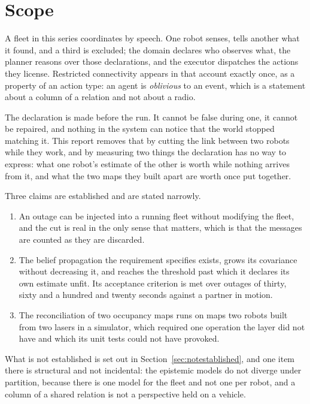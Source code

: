\documentclass[11pt,a4paper]{article}
\theoremstyle{definition}
\begin{document}
\tableofcontents
\newpage

\section{Scope}
\label{sec:scope}

A fleet in this series coordinates by speech. One robot senses, tells another
what it found, and a third is excluded; the domain declares who observes what,
the planner reasons over those declarations, and the executor dispatches the
actions they license. Restricted connectivity appears in that account exactly
once, as a property of an action type: an agent is \emph{oblivious} to an
event, which is a statement about a column of a relation and not about a radio.

The declaration is made before the run. It cannot be false during one, it
cannot be repaired, and nothing in the system can notice that the world stopped
matching it. This report removes that by cutting the link between two robots
while they work, and by measuring two things the declaration has no way to
express: what one robot's estimate of the other is worth while nothing arrives
from it, and what the two maps they built apart are worth once put together.

Three claims are established and are stated narrowly.

\begin{enumerate}[itemsep=3pt, topsep=4pt]
  \item An outage can be injected into a running fleet without modifying the
        fleet, and the cut is real in the only sense that matters, which is
        that the messages are counted as they are discarded.
  \item The belief propagation the requirement specifies exists, grows its
        covariance without decreasing it, and reaches the threshold past which
        it declares its own estimate unfit. Its acceptance criterion is met
        over outages of thirty, sixty and a hundred and twenty seconds against
        a partner in motion.
  \item The reconciliation of two occupancy maps runs on maps two robots built
        from two lasers in a simulator, which required one operation the layer
        did not have and which its unit tests could not have provoked.
\end{enumerate}

What is not established is set out in Section~\ref{sec:notestablished}, and one
item there is structural and not incidental: the epistemic models do not
diverge under partition, because there is one model for the fleet and not
one per robot, and a column of a shared relation is not a perspective held on
a vehicle.
\end{document}
